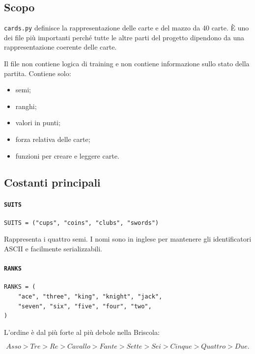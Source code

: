 \documentclass[11pt,a4paper]{article}
\begin{document}
\subsection{Scopo}

\texttt{cards.py} definisce la rappresentazione delle carte e del mazzo da 40
carte. È uno dei file più importanti perché tutte le altre parti del progetto
dipendono da una rappresentazione coerente delle carte.

Il file non contiene logica di training e non contiene informazione sullo stato
della partita. Contiene solo:

\begin{itemize}
  \item semi;
  \item ranghi;
  \item valori in punti;
  \item forza relativa delle carte;
  \item funzioni per creare e leggere carte.
\end{itemize}

\subsection{Costanti principali}

\paragraph{\texttt{SUITS}}

\begin{verbatim}
SUITS = ("cups", "coins", "clubs", "swords")
\end{verbatim}

Rappresenta i quattro semi. I nomi sono in inglese per mantenere gli
identificatori ASCII e facilmente serializzabili.

\paragraph{\texttt{RANKS}}

\begin{verbatim}
RANKS = (
    "ace", "three", "king", "knight", "jack",
    "seven", "six", "five", "four", "two",
)
\end{verbatim}

L'ordine è dal più forte al più debole nella Briscola:

\[
Asso > Tre > Re > Cavallo > Fante > Sette > Sei > Cinque > Quattro > Due.
\]
\end{document}
